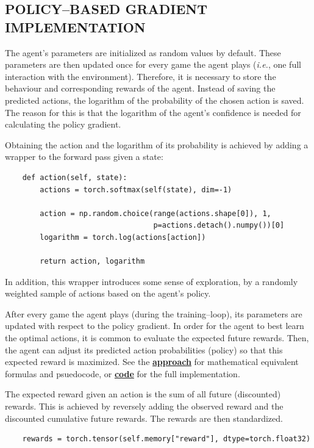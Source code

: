 \documentclass{article}
\let\oldhyperlink\hyperlink
\renewcommand{\hyperlink}[2]{\oldhyperlink{#1}{\textbf{#2}}}
\renewenvironment{leftbar}[1][\hsize]{
    \def\FrameCommand{{\color{barcolor}\vrule width 0.5pt \hspace{10pt}}}
    \MakeFramed{\hsize#1 \advance\hsize-\width \FrameRestore}
}{\endMakeFramed}
\begin{document}
\subsection*{\normalsize POLICY–BASED GRADIENT IMPLEMENTATION}
\begin{leftbar}
    The agent's parameters are initialized as random values by default. These parameters are then updated once for every game the agent plays (\textit{i.e.}, one full interaction with the environment). Therefore, it is necessary to store the behaviour and corresponding rewards of the agent. Instead of saving the predicted actions, the logarithm of the probability of the chosen action is saved. The reason for this is that the logarithm of the agent's confidence is needed for calculating the policy gradient.

    Obtaining the action and the logarithm of its probability is achieved by adding a wrapper to the forward pass given a state:

    \begin{lstlisting}
    def action(self, state):
        actions = torch.softmax(self(state), dim=-1)

        action = np.random.choice(range(actions.shape[0]), 1,
                                  p=actions.detach().numpy())[0]
        logarithm = torch.log(actions[action])

        return action, logarithm
    \end{lstlisting}

    In addition, this wrapper introduces some sense of exploration, by a randomly weighted sample of actions based on the agent's policy.

    After every game the agent plays (during the training–loop), its parameters are updated with respect to the policy gradient. In order for the agent to best learn the optimal actions, it is common to evaluate the expected future rewards. Then, the agent can adjust its predicted action probabilities (policy) so that this expected reward is maximized. See the \hyperlink{sec:policy-based-approach}{approach} for mathematical equivalent formulas and psuedocode, or \hyperlink{sec:code}{code} for the full implementation.

    The expected reward given an action is the sum of all future (discounted) rewards. This is achieved by reversely adding the observed reward and the discounted cumulative future rewards. The rewards are then standardized.

    \hypertarget{code:reward}{}
    \begin{lstlisting}
    rewards = torch.tensor(self.memory["reward"], dtype=torch.float32)


\end{lstlisting}
\end{leftbar}
\end{document}
